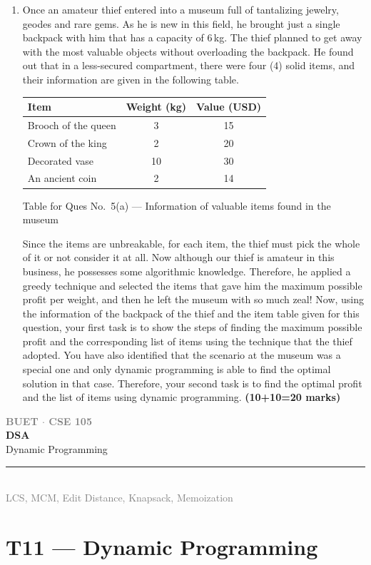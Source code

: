 \documentclass[12pt,a3paper]{article}
\newcommand{\mk}[1]{\textcolor{orange!70!black}{\small\textbf{(#1 marks)}}}
\newcommand{\secdivider}[4]{%
  \newpage\thispagestyle{empty}%
  \vspace*{\fill}%
  \begin{tcolorbox}[enhanced,colback=#4!7,colframe=#3,boxrule=1.5pt,arc=8pt,
    left=20pt,right=20pt,top=22pt,bottom=22pt,
    shadow={3pt}{-3pt}{0pt}{black!15}]
    \centering
    {\large\textcolor{gray}{\textbf{BUET $\cdot$ CSE 105}}}\\[8pt]
    {\fontsize{26}{32}\selectfont\bfseries\textcolor{#3}{DSA}}\\[6pt]
    {\fontsize{15}{19}\selectfont\textcolor{dgray}{#1}}\\[12pt]
    \textcolor{#3!60}{\rule{0.5\textwidth}{0.5pt}}\\[6pt]
    {\small\textcolor{gray}{#2}}
  \end{tcolorbox}%
  \vspace*{\fill}\newpage%
}
\begin{document}
\begin{enumerate}
\item Once an amateur thief entered into a museum full of tantalizing jewelry,
geodes and rare gems. As he is new in this field, he brought just a single
backpack with him that has a capacity of 6\,kg. The thief planned to get away
with the most valuable objects without overloading the backpack. He found out
that in a less-secured compartment, there were four (4) solid items, and their
information are given in the following table.

\begin{center}
\begin{tabular}{|l|c|c|}
\hline
\textbf{Item} & \textbf{Weight (kg)} & \textbf{Value (USD)} \\
\hline
Brooch of the queen & 3  & 15 \\
Crown of the king   & 2  & 20 \\
Decorated vase      & 10 & 30 \\
An ancient coin     & 2  & 14 \\
\hline
\end{tabular}

\smallskip
\small Table for Ques No.~5(a) --- Information of valuable items found in the museum
\end{center}

Since the items are unbreakable, for each item, the thief must pick the whole
of it or not consider it at all. Now although our thief is amateur in this
business, he possesses some algorithmic knowledge. Therefore, he applied a
greedy technique and selected the items that gave him the maximum possible
profit per weight, and then he left the museum with so much zeal! Now, using
the information of the backpack of the thief and the item table given for this
question, your first task is to show the steps of finding the maximum possible
profit and the corresponding list of items using the technique that the thief
adopted. You have also identified that the scenario at the museum was a special
one and only dynamic programming is able to find the optimal solution in that
case. Therefore, your second task is to find the optimal profit and the list of
items using dynamic programming. \mk{10+10=20}

\end{enumerate}
\newpage

\secdivider{Dynamic Programming}{LCS, MCM, Edit Distance, Knapsack, Memoization}{cD}{cD}
\label{sec:T11}
\section{T11 --- Dynamic Programming}
\end{document}
